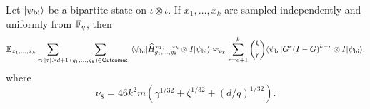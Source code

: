 \begin{lemma}\label{lem:from-H-to-G}
	\leanok
	Let $\lvert \psi_{\mathrm{bi}} \rangle$ be a bipartite state on $\iota \otimes \iota$.  If
	$x_1,\dots,x_k$ are sampled independently and uniformly from $\mathbb{F}_q$, then
	\[
		\mathbb{E}_{x_1,\dots,x_k} \sum_{\tau:\,|\tau|\ge d+1} \sum_{(g_1,\dots,g_k)\in \mathsf{Outcomes}_\tau}
		\langle \psi_{\mathrm{bi}} \rvert \widehat H_{g_1,\dots,g_k}^{x_1,\dots,x_k} \otimes I \lvert \psi_{\mathrm{bi}} \rangle
		\approx_{\nu_8}
		\sum_{r=d+1}^k \binom{k}{r} \langle \psi_{\mathrm{bi}} \rvert G^r(I-G)^{k-r} \otimes I
		\lvert \psi_{\mathrm{bi}} \rangle,
	\]
	where
	\[
		\nu_8 = 46k^2m\left(\gamma^{1/32}+\zeta^{1/32}+(d/q)^{1/32}\right).
	\]
\end{lemma}
